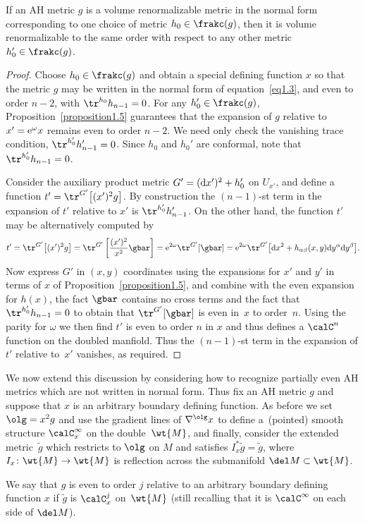 \begin{Proposition}\label{proposition1.5b}
If an AH metric $g$ is a volume renormalizable metric in the normal form corresponding to one choice of metric $h_0 \in \frakc (g)$,
then it is volume renormalizable to the same order with respect to any other metric $h_0' \in \frakc(g)$.
\end{Proposition}
\begin{proof} Choose $h_0 \in \frakc (g)$ and obtain a special defining function $x$ so that the metric $g$ may be written in the normal form of equation~\eqref{eq1.3}, and even to order $n-2$, with $\tr^{h_0} h_{n-1} = 0$. For any $h_0' \in \frakc(g)$, Proposition~\ref{proposition1.5} guarantees that the expansion of $g$ relative to $x' = {\rm e}^{\omega} x$ remains even to order $n-2$. We need only check the vanishing trace condition, $\tr^{h_0'} h_{n-1}' = 0$. Since $h_0$ and $h_0'$ are conformal, note that $\tr^{h_0'} h_{n-1} = 0$.
	
Consider the auxiliary product metric $G' = ({\rm d}x')^2 + h_0'$ on $U_{x'}$, and define a function $t' = \tr^{G'} \big[(x')^2 g\big]$. By construction the $(n-1)$-st term in the expansion of $t'$ relative to $x'$ is $\tr^{h_0'} h_{n-1}'$. On the other hand, the function $t'$ may be alternatively computed by
\begin{gather*}
	t' = \tr^{G'} \big[(x')^2 g\big] = \tr^{G'} \left[ \frac{(x')^2}{x^2} \gbar \right]
	= {\rm e}^{2\omega} \tr^{G'} [ \gbar ] = {\rm e}^{2\omega} \tr^{G'} \big[ {\rm d}x^2 + h_{\alpha \beta}(x,y) {\rm d}y^{\alpha} {\rm d}y^{\beta} \big].
\end{gather*}
Now express $G'$ in $(x,y)$ coordinates using the expansions for $x'$ and $y'$ in terms of $x$ of Proposition~\ref{proposition1.5}, and combine with the even expansion for $h(x)$, the fact $\gbar$ contains no cross terms and the fact that $\tr^{h_0'} h_{n-1} = 0$ to obtain that $\tr^{G'} [ \gbar ]$ is even in~$x$ to order~$n$. Using the parity for $\omega$ we then find $t'$ is even to order $n$ in $x$ and thus defines a $\calC^n$ function on the doubled manfiold. Thus the $(n-1)$-st term in the expansion of $t'$ relative to~$x'$ vanishes, as required.
\end{proof}

We now extend this discussion by considering how to recognize partially even AH metrics which are not written in
normal form. Thus fix an AH metric $g$ and suppose that $x$ is an arbitrary boundary defining function. As before
we set $\olg = x^2 g$ and use the gradient lines of $\nabla^{\olg} x$ to define a~(pointed) smooth structure $\calC^{\infty}_x$ on the
double~$\wt{M}$, and finally, consider the extended metric~$\tilde{g}$ which restricts to $\olg$ on $M$ and
satisfies $I_x^* \tilde{g} = \tilde{g}$, where $I_x\colon \wt{M} \to \wt{M}$ is reflection across the submanifold $\del M \subset \wt{M}$.
\begin{Definition}\label{definition1.6} \label{defn-even}
We say that $g$ is even to order $j$ relative to an arbitrary boundary defining function $x$ if $\tilde{g}$ is $\calC^{j}_x$ on~$\wt{M}$ (still recalling that it is $\calC^\infty$ on each side of $\del M$).
\end{Definition}

